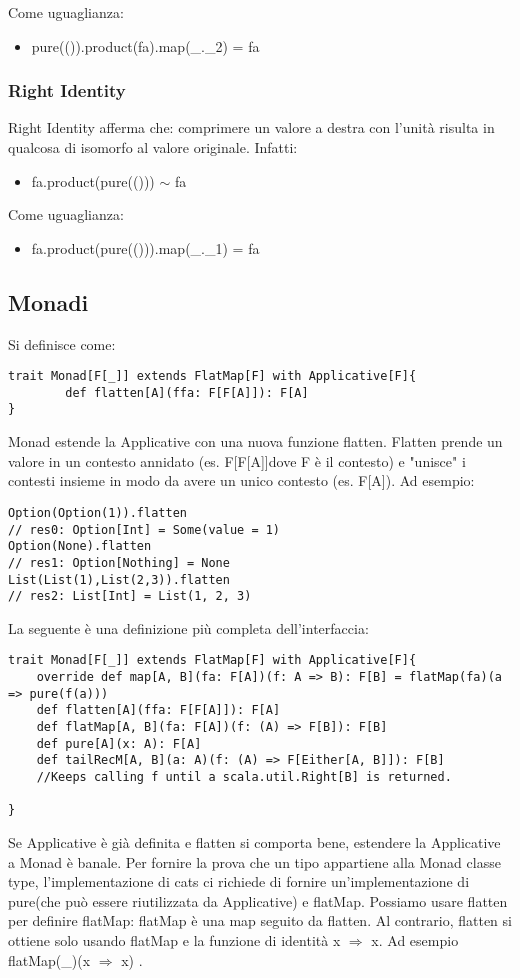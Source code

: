 \noindent Come uguaglianza:
\begin{itemize}
    \item pure(()).product(fa).map(\_.\_2) = fa
\end{itemize}

\subsubsection{Right Identity}
Right Identity afferma che: comprimere un valore a destra con l'unità risulta in qualcosa di isomorfo al valore originale.
Infatti:
\begin{itemize}
    \item fa.product(pure(())) $\sim$ fa
\end{itemize}
Come uguaglianza:
\begin{itemize}
    \item fa.product(pure(())).map(\_.\_1) = fa
\end{itemize}




\subsection{Monadi}
Si definisce come:
\begin{verbatim}
trait Monad[F[_]] extends FlatMap[F] with Applicative[F]{
        def flatten[A](ffa: F[F[A]]): F[A]
}
\end{verbatim}
\noindent Monad estende la Applicative con una nuova funzione flatten. Flatten prende un valore in un contesto annidato (es. F[F[A]]dove F è il contesto) e "unisce" i contesti insieme in modo da avere un unico contesto (es. F[A]).
Ad esempio:
\begin{verbatim}
Option(Option(1)).flatten
// res0: Option[Int] = Some(value = 1)
Option(None).flatten
// res1: Option[Nothing] = None
List(List(1),List(2,3)).flatten
// res2: List[Int] = List(1, 2, 3)    
\end{verbatim}
La seguente è una definizione più completa dell'interfaccia:
\begin{verbatim}
trait Monad[F[_]] extends FlatMap[F] with Applicative[F]{
    override def map[A, B](fa: F[A])(f: A => B): F[B] = flatMap(fa)(a => pure(f(a)))
    def flatten[A](ffa: F[F[A]]): F[A]
    def flatMap[A, B](fa: F[A])(f: (A) => F[B]): F[B]
    def pure[A](x: A): F[A]
    def tailRecM[A, B](a: A)(f: (A) => F[Either[A, B]]): F[B] 
    //Keeps calling f until a scala.util.Right[B] is returned.

}
\end{verbatim}
\noindent Se Applicative è già definita e flatten si comporta bene, estendere la Applicative a Monad è banale. Per fornire la prova che un tipo appartiene alla Monad classe type, l'implementazione di cats ci richiede di fornire un'implementazione di pure(che può essere riutilizzata da Applicative) e flatMap. Possiamo usare flatten per definire flatMap: flatMap è una map seguito da flatten. Al contrario, flatten si ottiene solo usando flatMap e la funzione di identità x $\Rightarrow$ x. Ad esempio flatMap(\_)(x $\Rightarrow$ x) .


